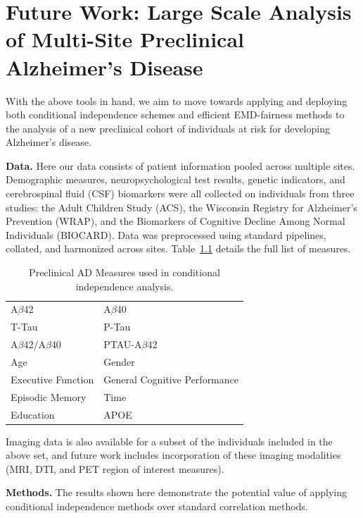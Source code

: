 \chapter{Future Work: Large Scale Analysis of Multi-Site Preclinical Alzheimer's Disease} \label{chap:pac} 

With the above tools in hand, we aim to move towards applying and deploying both conditional independence schemes and efficient EMD-fairness methods to 
the analysis of a new preclinical cohort of individuals at risk for developing Alzheimer's disease.

\textbf{Data.} Here our data consists of patient information pooled across multiple sites. Demographic measures, neuropsychological test results, genetic indicators, and cerebrospinal fluid (CSF) biomarkers were all collected on individuals from three studies: the Adult Children Study (ACS), the Wisconsin Registry for Alzheimer's Prevention (WRAP), and the Biomarkers of Cognitive Decline Among Normal Individuals (BIOCARD). Data was preprocessed using standard pipelines, collated, and harmonized across sites. Table~\ref{tab:pacfeats} details the full list of measures.

\begin{table}[]
    \centering
    \begin{tabular}{l|l}
        \hline\hline
         A$\beta$42 & A$\beta$40 \\
         T-Tau & P-Tau \\
         A$\beta$42/A$\beta$40 & PTAU-A$\beta$42 \\
         Age & Gender \\
         Executive Function & General Cognitive Performance \\
         Episodic Memory & Time \\
         Education & APOE \\
         \hline\hline
    \end{tabular}
    \caption{Preclinical AD Measures used in conditional independence analysis.}
    \label{tab:pacfeats}
\end{table}

Imaging data is also available for a subset of the individuals included in the above set, and future work includes incorporation of these imaging modalities (MRI, DTI, and PET region of interest measures).

\textbf{Methods.} The results shown here demonstrate the potential value of applying conditional independence methods over standard correlation methods. 

